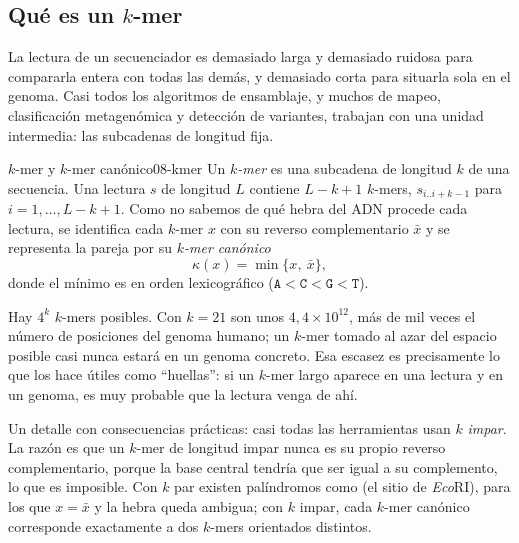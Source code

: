 \subsection{Qué es un \texorpdfstring{$k$}{k}-mer}

La lectura de un secuenciador es demasiado larga y demasiado ruidosa para compararla entera con todas las demás, y demasiado corta para situarla sola en el genoma. Casi todos los algoritmos de ensamblaje, y muchos de mapeo, clasificación metagenómica y detección de variantes, trabajan con una unidad intermedia: las subcadenas de longitud fija.

\begin{definicion}{$k$-mer y $k$-mer canónico}{08-kmer}
Un \emph{$k$-mer} es una subcadena de longitud $k$ de una secuencia. Una lectura $s$ de longitud $L$ contiene $L-k+1$ $k$-mers, $s_{i..i+k-1}$ para $i=1,\dots,L-k+1$. Como no sabemos de qué hebra del ADN procede cada lectura, se identifica cada $k$-mer $x$ con su reverso complementario $\bar{x}$ y se representa la pareja por su \emph{$k$-mer canónico}
\begin{equation}\label{eq:08-canonico}
\kappa(x) = \min\{x,\ \bar{x}\},
\end{equation}
donde el mínimo es en orden lexicográfico ($\texttt{A}<\texttt{C}<\texttt{G}<\texttt{T}$).
\end{definicion}

\begin{simbolos}
\end{simbolos}

Hay $4^k$ $k$-mers posibles. Con $k=21$ son unos $4{,}4\times10^{12}$, más de mil veces el número de posiciones del genoma humano; un $k$-mer tomado al azar del espacio posible casi nunca estará en un genoma concreto. Esa escasez es precisamente lo que los hace útiles como ``huellas'': si un $k$-mer largo aparece en una lectura y en un genoma, es muy probable que la lectura venga de ahí.

Un detalle con consecuencias prácticas: casi todas las herramientas usan $k$ \emph{impar}. La razón es que un $k$-mer de longitud impar nunca es su propio reverso complementario, porque la base central tendría que ser igual a su complemento, lo que es imposible. Con $k$ par existen palíndromos como  (el sitio de \emph{Eco}RI), para los que $x=\bar{x}$ y la hebra queda ambigua; con $k$ impar, cada $k$-mer canónico corresponde exactamente a dos $k$-mers orientados distintos.


